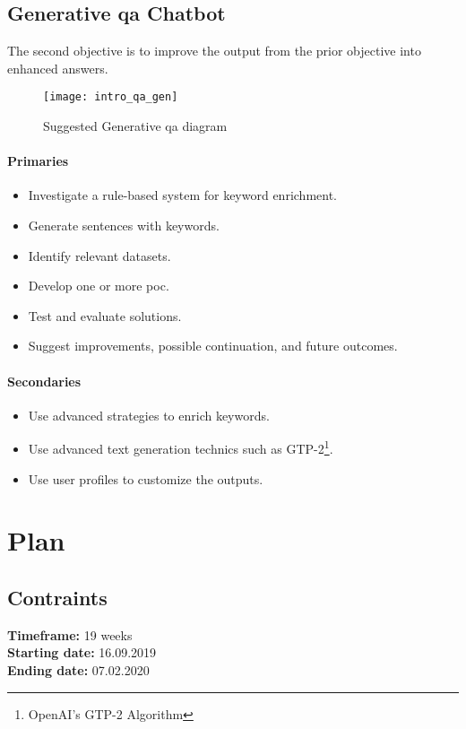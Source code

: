 \subsection*{Generative \gls{qa} Chatbot}
The second objective is to improve the output from the prior objective into enhanced answers.
\begin{figure}[ht!]
    \centering
    \texttt{[image: intro\_qa\_gen]}
    \caption{Suggested Generative \gls{qa} diagram}
    \label{fig:intro_qa_gen}
\end{figure}

\paragraph{Primaries}
\begin{itemize}[noitemsep]
    \item Investigate a rule-based system for keyword enrichment.
    \item Generate sentences with keywords.
    \item Identify relevant datasets.
    \item Develop one or more \gls{poc}.
    \item Test and evaluate solutions.
    \item Suggest improvements, possible continuation, and future outcomes.
\end{itemize}
\paragraph{Secondaries}
\begin{itemize}[noitemsep]
    \item Use advanced strategies to enrich keywords.
    \item Use advanced text generation technics such as GTP-2\footnote{OpenAI's GTP-2 Algorithm\cite{papers:gpt2}}.
    \item Use user profiles to customize the outputs.
\end{itemize}


\section*{Plan}
\label{plan:plan}
\subsection*{Contraints}
\textbf{Timeframe:} 19 weeks\\
\textbf{Starting date:} 16.09.2019\\
\textbf{Ending date:} 07.02.2020

